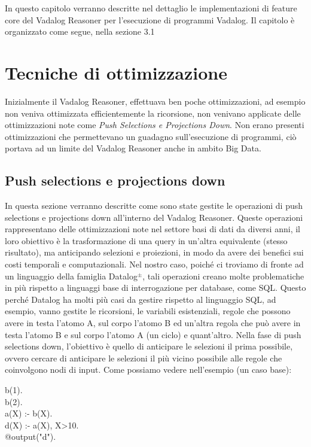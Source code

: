 In questo capitolo verranno descritte nel dettaglio le implementazioni di feature core del Vadalog Reasoner per l'esecuzione di programmi Vadalog. \newline
Il capitolo è organizzato come segue, nella sezione 3.1 

\section{Tecniche di ottimizzazione}

Inizialmente il Vadalog Reasoner, effettuava ben poche ottimizzazioni, ad esempio non veniva ottimizzata efficientemente la ricorsione, non venivano applicate delle ottimizzazioni note come \emph{Push Selections e Projections Down}. Non erano presenti ottimizzazioni che permettevano un guadagno sull'esecuzione di programmi, ciò portava ad un limite del Vadalog Reasoner anche in ambito Big Data.

\subsection{Push selections e projections down}

In questa sezione verranno descritte come sono state gestite le operazioni di push selections e projections down all'interno del Vadalog Reasoner. \newline
Queste operazioni rappresentano delle ottimizzazioni note nel settore basi di dati da diversi anni, il loro obiettivo è la trasformazione di una query in un'altra equivalente (stesso risultato), ma anticipando selezioni e proiezioni, in modo da avere dei benefici sui costi temporali e computazionali. \newline
Nel nostro caso, poiché ci troviamo di fronte ad un linguaggio della famiglia Datalog$^\pm$, tali operazioni creano molte problematiche in più rispetto a linguaggi base di interrogazione per database, come SQL. \newline
Questo perché Datalog ha molti più casi da gestire rispetto al linguaggio SQL, ad esempio, vanno gestite le ricorsioni, le variabili esistenziali, regole che possono avere in testa l'atomo A, sul corpo l'atomo B ed un'altra regola che può avere in testa l'atomo B e sul corpo l'atomo A (un ciclo) e quant'altro. \newline \newline
Nella fase di push selections down, l'obiettivo è quello di anticipare le selezioni il prima possibile, ovvero cercare di anticipare le selezioni il più vicino possibile alle regole che coinvolgono nodi di input. Come possiamo vedere nell'esempio (un caso base): 
\begin{algorithm}[h]
	b(1). \\
	b(2). \\
	a(X) :- b(X). \\
	d(X) :- a(X), X>10. \\
	@output("d").
\end{algorithm} 


